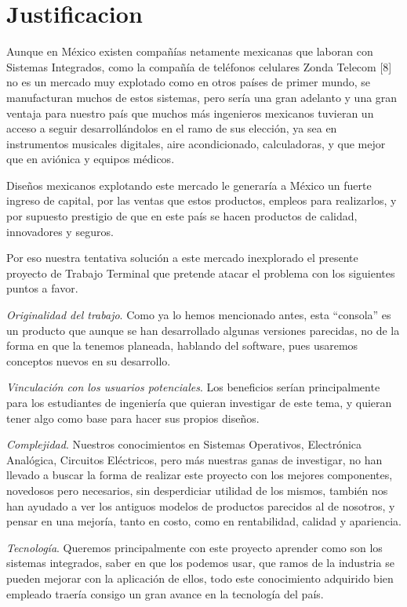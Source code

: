 \chapter{Justificacion}

Aunque en México existen compañías netamente mexicanas que laboran con Sistemas Integrados, como la compañía de teléfonos celulares Zonda Telecom [8] no es un mercado muy explotado como en otros países de primer mundo, se manufacturan muchos de estos sistemas, pero sería una gran adelanto y una gran ventaja para nuestro país que muchos más ingenieros mexicanos tuvieran un acceso a seguir desarrollándolos en el ramo de sus elección, ya sea en instrumentos musicales digitales, aire acondicionado, calculadoras, y que mejor que en aviónica y equipos médicos.\medskip

Diseños mexicanos explotando este mercado le generaría a México un fuerte ingreso de capital, por las ventas que estos productos, empleos para realizarlos, y por supuesto prestigio de que en este país se hacen productos de calidad, innovadores y seguros.\medskip

Por eso nuestra tentativa solución a este mercado inexplorado el presente proyecto de Trabajo Terminal que pretende atacar el problema con los siguientes puntos a favor. \medskip

{\em Originalidad del trabajo}. Como ya lo hemos mencionado antes, esta “consola” es un producto que aunque se han desarrollado algunas versiones parecidas, no de la forma en que la tenemos planeada, hablando del software, pues usaremos conceptos nuevos en su desarrollo.\medskip

{\em Vinculación con los usuarios potenciales}. Los beneficios serían principalmente para los estudiantes de ingeniería que quieran investigar de este tema, y quieran tener algo como base para hacer sus propios diseños.\medskip

{\em Complejidad}. Nuestros conocimientos en Sistemas Operativos, Electrónica Analógica, Circuitos Eléctricos, pero más nuestras ganas de investigar, no han llevado a buscar la forma de realizar este proyecto con los mejores componentes, novedosos pero necesarios, sin desperdiciar utilidad de los mismos, también nos han ayudado a ver los antiguos modelos de productos parecidos al de nosotros, y pensar en una mejoría, tanto en costo, como en rentabilidad, calidad y apariencia.\medskip

{\em Tecnología}. Queremos principalmente con este proyecto aprender como son los sistemas integrados, saber en que los podemos usar, que ramos de la industria se pueden mejorar con la aplicación de ellos, todo este conocimiento adquirido bien empleado traería consigo un gran avance en la tecnología del país.\medskip

